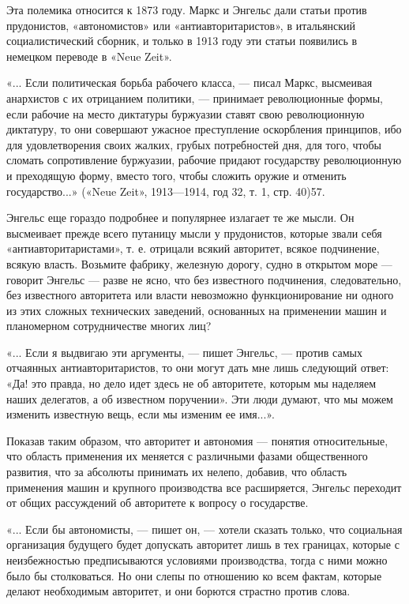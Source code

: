 \documentclass[12pt]{article}
\newcommand{\parnum}{(\arabic{parcount})}
\newcounter{parcount}
\newenvironment{parnumbers}{%
  \par%
  \everypar{\noindent \stepcounter{parcount}\marginpar[]{\parnum}}%
}{}
\begin{document}
\begin{parnumbers}
Эта полемика относится к 1873 году. Маркс и Энгельс дали статьи против прудонистов, «автономистов» или «антиавторитаристов», в итальянский социалистический сборник, и только в 1913 году эти статьи появились в немецком переводе в «Neue Zeit».

«... Если политическая борьба рабочего класса, — писал Маркс, высмеивая анархистов с их отрицанием политики, — принимает революционные формы, если рабочие на место диктатуры буржуазии ставят свою революционную диктатуру, то они совершают ужасное преступление оскорбления принципов, ибо для удовлетворения своих жалких, грубых потребностей дня, для того, чтобы сломать сопротивление буржуазии, рабочие придают государству революционную и преходящую форму, вместо того, чтобы сложить оружие и отменить государство...» («Neue Zeit», 1913—1914, год 32, т. 1, стр. 40)57.

Энгельс еще гораздо подробнее и популярнее излагает те же мысли. Он высмеивает прежде всего путаницу мысли у прудонистов, которые звали себя «антиавторитаристами», т. е. отрицали всякий авторитет, всякое подчинение, всякую власть. Возьмите фабрику, железную дорогу, судно в открытом море — говорит Энгельс — разве не ясно, что без известного подчинения, следовательно, без известного авторитета или власти невозможно функционирование ни одного из этих сложных технических заведений, основанных на применении машин и планомерном сотрудничестве многих лиц?

«... Если я выдвигаю эти аргументы, — пишет Энгельс, — против самых отчаянных антиавторитаристов, то они могут дать мне лишь следующий ответ: «Да! это правда, но дело идет здесь не об авторитете, которым мы наделяем наших делегатов, а об известном поручении». Эти люди думают, что мы можем изменить известную вещь, если мы изменим ее имя...».

Показав таким образом, что авторитет и автономия — понятия относительные, что область применения их меняется с различными фазами общественного развития, что за абсолюты принимать их нелепо, добавив, что область применения машин и крупного производства все расширяется, Энгельс переходит от общих рассуждений об авторитете к вопросу о государстве.

«... Если бы автономисты, — пишет он, — хотели сказать только, что социальная организация будущего будет допускать авторитет лишь в тех границах, которые с неизбежностью предписываются условиями производства, тогда с ними можно было бы столковаться. Но они слепы по отношению ко всем фактам, которые делают необходимым авторитет, и они борются страстно против слова.


\end{parnumbers}
\end{document}
